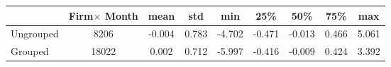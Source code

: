 \begin{tabular}{lcccccccc}
\toprule
{} &  Firm$ \times $ Month &   mean &    std &    min &    25\% &    50\% &    75\% &    max \\
\midrule
Ungrouped &                   8206 & -0.004 &  0.783 & -4.702 & -0.471 & -0.013 &  0.466 &  5.061 \\
Grouped   &                  18022 &  0.002 &  0.712 & -5.997 & -0.416 & -0.009 &  0.424 &  3.392 \\
\bottomrule
\end{tabular}
